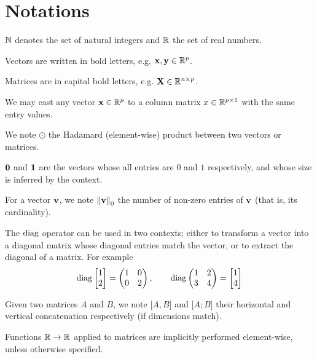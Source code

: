 \cleardoublepage
\chapter*{Notations}

$\mathbb{N}$ denotes the set of natural integers and $\mathbb{R}$ the set of real numbers.

Vectors are written in bold letters, e.g. $\mathbf{x}, \mathbf{y} \in \mathbb{R}^p$.

Matrices are in capital bold letters, e.g. $\mathbf{X} \in \mathbb{R}^{n \times p}$.

We may cast any vector $\mathbf{x} \in \mathbb{R}^p$ to a column matrix $x \in \mathbb{R}^{p \times 1}$ with the same entry values.

We note $\odot$ the Hadamard (element-wise) product between two vectors or matrices.

$\mathbf{0}$ and $\mathbf{1}$ are the vectors whose all entries are $0$ and $1$ respectively, and whose size is inferred by the context.

For a vector $\mathbf{v}$, we note $\left\lVert\mathbf{v}\right\rVert_0$ the number of non-zero entries of $\mathbf{v}$ (that is, its cardinality).

The $\operatorname*{diag}$ operator can be used in two contexts;
either to transform a vector into a diagonal matrix whose diagonal entries match the vector,
or to extract the diagonal of a matrix.
For example
\begin{equation*}
    \diag \begin{bmatrix}
         1\\
         2
    \end{bmatrix}
    =
    \left(\begin{array}{@{}cc@{}}
        1 & 0\\
        0 & 2
    \end{array}\right)
    ,\qquad
    \diag \left(\begin{array}{@{}cc@{}}
        1 & 2\\
        3 & 4
    \end{array}\right)
    =
    \begin{bmatrix}
         1\\
         4
    \end{bmatrix}
\end{equation*}

Given two matrices $A$ and $B$, we note $\big[ A, B \big]$ and $\big[ A; B \big]$ their horizontal and
vertical concatenation respectively (if dimensions match).

Functions $\mathbb{R} \to \mathbb{R}$ applied to matrices are implicitly performed element-wise, unless otherwise specified.

